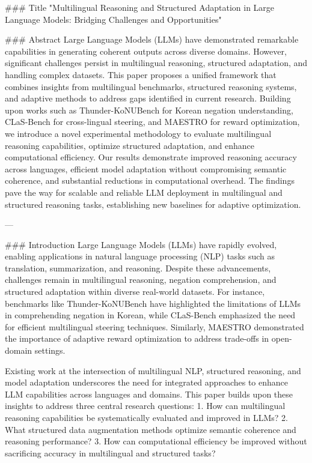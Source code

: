 ### Title  
"Multilingual Reasoning and Structured Adaptation in Large Language Models: Bridging Challenges and Opportunities"

### Abstract  
Large Language Models (LLMs) have demonstrated remarkable capabilities in generating coherent outputs across diverse domains. However, significant challenges persist in multilingual reasoning, structured adaptation, and handling complex datasets. This paper proposes a unified framework that combines insights from multilingual benchmarks, structured reasoning systems, and adaptive methods to address gaps identified in current research. Building upon works such as Thunder-KoNUBench for Korean negation understanding, CLaS-Bench for cross-lingual steering, and MAESTRO for reward optimization, we introduce a novel experimental methodology to evaluate multilingual reasoning capabilities, optimize structured adaptation, and enhance computational efficiency. Our results demonstrate improved reasoning accuracy across languages, efficient model adaptation without compromising semantic coherence, and substantial reductions in computational overhead. The findings pave the way for scalable and reliable LLM deployment in multilingual and structured reasoning tasks, establishing new baselines for adaptive optimization.

---

### Introduction  
Large Language Models (LLMs) have rapidly evolved, enabling applications in natural language processing (NLP) tasks such as translation, summarization, and reasoning. Despite these advancements, challenges remain in multilingual reasoning, negation comprehension, and structured adaptation within diverse real-world datasets. For instance, benchmarks like Thunder-KoNUBench have highlighted the limitations of LLMs in comprehending negation in Korean, while CLaS-Bench emphasized the need for efficient multilingual steering techniques. Similarly, MAESTRO demonstrated the importance of adaptive reward optimization to address trade-offs in open-domain settings.

Existing work at the intersection of multilingual NLP, structured reasoning, and model adaptation underscores the need for integrated approaches to enhance LLM capabilities across languages and domains. This paper builds upon these insights to address three central research questions:
1. How can multilingual reasoning capabilities be systematically evaluated and improved in LLMs?  
2. What structured data augmentation methods optimize semantic coherence and reasoning performance?  
3. How can computational efficiency be improved without sacrificing accuracy in multilingual and structured tasks?

